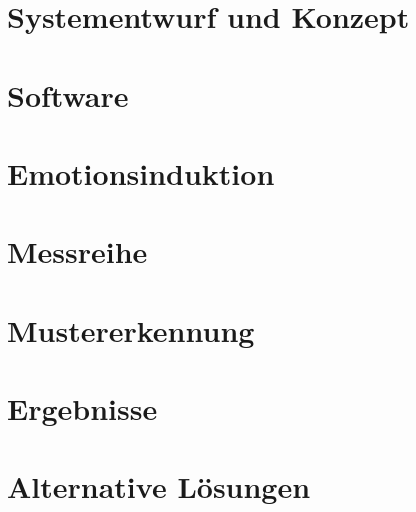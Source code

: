 

\section{Systementwurf und Konzept} \label{systementwurf-4}



\newpage
\section{Software} \label{realisierung-4}



\newpage
\section{Emotionsinduktion} \label{emotionsinduktion-4}



\newpage
\section{Messreihe} \label{messreihe-4}



\newpage
\section{Mustererkennung} \label{mustererkennung-4}


\section{Ergebnisse} \label{ergenisse-4}


\newpage
\section{Alternative L{\"o}sungen} \label{alternativen-4}

